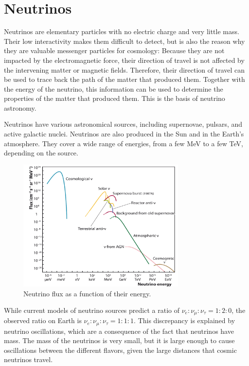 \section{Neutrinos}

Neutrinos are elementary particles with no electric charge and very little mass.
Their low interactivity
  makes them difficult to detect,
  but is also the reason why they are valuable messenger particles for cosmology:
Because they are not impacted by the electromagnetic force,
  their direction of travel is not affected by the intervening matter or magnetic fields.
Therefore,
  their direction of travel can be used to trace back the path of the matter that produced them.
Together with the energy of the neutrino,
  this information can be used to determine the properties of the matter that produced them.
This is the basis of neutrino astronomy.

Neutrinos have various astronomical sources,
including supernovae, pulsars, and active galactic nuclei.
Neutrinos are also produced in the Sun and in the Earth's atmosphere.
They cover a wide range of energies, from a few MeV to a few TeV,
  depending on the source.

\begin{figure}
  \centering
  \includegraphics[width=0.75\textwidth]{content/plots/halftime/neutrinos-energy.png}
  \caption{Neutrino flux as a function of their energy.}
  \label{fig:neutrinos:flux_spectrum}
\end{figure}


While current models of neutrino sources predict a ratio of
  $\nu_e:\nu_\mu:\nu_\tau = 1:2:0$,
the observed ratio on Earth is
  $\nu_e:\nu_\mu:\nu_\tau = 1:1:1$.
This discrepancy is explained by neutrino oscillations,
  which are a consequence of the fact that neutrinos have mass.
The mass of the neutrinos is very small,
  but it is large enough to cause oscillations between the different flavors,
  given the large distances that cosmic neutrinos travel.

